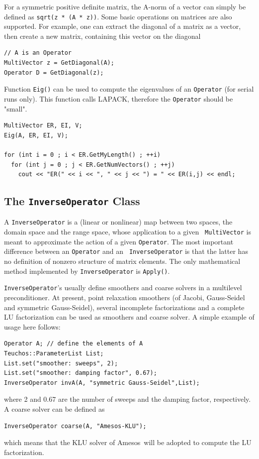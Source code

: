 \documentclass{article}[11pt]
\newcommand{\amesos}  {{\sc Amesos}}
\begin{document}
\smallskip

For a symmetric positive definite matrix, the A-norm of a vector can simply be
defined as \verb!sqrt(z * (A * z))!.
Some basic operations on matrices are also supported. For example,
one can extract the diagonal of a matrix as a vector, then create a new
matrix, containing this vector on the diagonal
\begin{verbatim}    
// A is an Operator
MultiVector z = GetDiagonal(A);
Operator D = GetDiagonal(z);
\end{verbatim}

Function {\tt Eig()} can be used to compute the eigenvalues of an
{\tt Operator}
(for serial runs only). This function calls LAPACK, therefore the
{\tt Operator} should be "small".
\begin{verbatim}    
MultiVector ER, EI, V;
Eig(A, ER, EI, V);

for (int i = 0 ; i < ER.GetMyLength() ; ++i)
  for (int j = 0 ; j < ER.GetNumVectors() ; ++j)
    cout << "ER(" << i << ", " << j << ") = " << ER(i,j) << endl;
\end{verbatim}

\subsection{The {\tt InverseOperator} Class}
\label{sec:inverseoperator}

A {\tt InverseOperator} is a (linear or nonlinear) map between two spaces, the
domain space and the range space, whose application to a given {\tt
  MultiVector} is meant to approximate the action of a given {\tt Operator}.
The most important difference between an {\tt Operator} and an {\tt
  InverseOperator} is that the latter has no definition of nonzero
  structure of matrix elements. The only mathematical method implemented
  by {\tt InverseOperator} is {\tt Apply()}.

{\tt InverseOperator}'s usually define smoothers and coarse solvers in a
multilevel preconditioner. At present, point relaxation smoothers (of Jacobi,
Gauss-Seidel and symmetric Gauss-Seidel), several incomplete factorizations
and a complete LU factorization can be used as smoothers and coarse solver. A
simple example of usage here follows:
\begin{verbatim}
Operator A; // define the elements of A
Teuchos::ParameterList List;
List.set("smoother: sweeps", 2); 
List.set("smoother: damping factor", 0.67);
InverseOperator invA(A, "symmetric Gauss-Seidel",List);
\end{verbatim}
where 2 and 0.67 are the number of sweeps and the damping factor,
  respectively. A coarse solver can be defined as
\begin{verbatim}
InverseOperator coarse(A, "Amesos-KLU");
\end{verbatim}
which means that the KLU solver of \amesos\ will be adopted to compute the LU
factorization.
\end{document}
